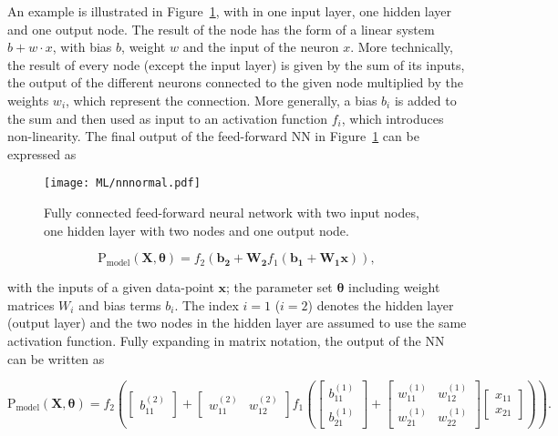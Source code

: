 An example is illustrated in Figure~\ref{ML:normalNN}, with in one input layer, one hidden layer and one output node. The result of the node has the form of a linear system $b+w\cdot x$, with bias $b$, weight $w$ and the input of the neuron $x$. More technically, the result of every node (except the input layer) is given by the sum of its inputs, the output of the different neurons connected to the given node multiplied by the weights $w_i$, which represent the connection. More generally, a bias $b_i$ is added to the sum and then used as input to an activation function $f_i$, which introduces non-linearity. The final output of the feed-forward NN in Figure~\ref{ML:normalNN} can be expressed as

\begin{figure}[htbp]
    \RawFloats
    \begin{center}
    \texttt{[image: ML/nnnormal.pdf]}
    \caption{
        Fully connected feed-forward neural network with two input nodes, one hidden layer with two nodes and one output node.
    }
    \label{ML:normalNN}
    \end{center}
\end{figure}

\begin{equation}
    \text{P}_\text{model}(\mathbf{X},\boldsymbol{\theta}) = f_2(\mathbf{b_2}+\mathbf{W_2}f_1(\mathbf{b_1}+\mathbf{W_1}\mathbf{x})),
\end{equation}

with the inputs of a given data-point $\mathbf{x}$; the parameter set $\boldsymbol{\theta}$ including weight matrices $W_i$ and bias terms $b_i$. The index $i=1$ ($i=2$) denotes the hidden layer (output layer) and the two nodes in the hidden layer are assumed to use the same activation function. Fully expanding in matrix notation, the output of the NN can be written as

\begin{equation}
    \text{P}_\text{model}(\mathbf{X},\boldsymbol{\theta}) = f_2\left( \begin{bmatrix} b_{11}^{(2)} \end{bmatrix}+ \begin{bmatrix} w_{11}^{(2)} & w_{12}^{(2)}\end{bmatrix}f_1\left( \begin{bmatrix} b_{11}^{(1)} \\  
                                                            b_{21}^{(1)}  \end{bmatrix}+ \begin{bmatrix} 
    w_{11}^{(1)} & w_{12}^{(1)} \\ 
    w_{21}^{(1)} & w_{22}^{(1)}\end{bmatrix} \begin{bmatrix}
        x_{11}\\
        x_{21}
    \end{bmatrix} \right) \right).
\end{equation}

